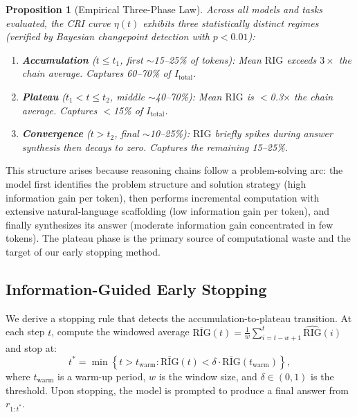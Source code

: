 \documentclass{article}
\newtheorem{proposition}[theorem]{Proposition}
\newcommand{\RIG}{\mathrm{RIG}}
\newcommand{\Itotal}{I_{\mathrm{total}}}
\begin{document}
\begin{proposition}[Empirical Three-Phase Law]
\label{prop:phases}
Across all models and tasks evaluated, the CRI curve $\eta(t)$ exhibits three statistically distinct regimes (verified by Bayesian changepoint detection with $p < 0.01$):
\begin{enumerate}[leftmargin=*,itemsep=1pt]
    \item \textbf{Accumulation} ($t \leq t_1$, first $\sim$15--25\% of tokens): Mean $\RIG$ exceeds $3\times$ the chain average. Captures 60--70\% of $\Itotal$.
    \item \textbf{Plateau} ($t_1 < t \leq t_2$, middle $\sim$40--70\%): Mean $\RIG$ is $<$0.3$\times$ the chain average. Captures $<$15\% of $\Itotal$.
    \item \textbf{Convergence} ($t > t_2$, final $\sim$10--25\%): $\RIG$ briefly spikes during answer synthesis then decays to zero. Captures the remaining 15--25\%.
\end{enumerate}
\end{proposition}

This structure arises because reasoning chains follow a problem-solving arc: the model first identifies the problem structure and solution strategy (high information gain per token), then performs incremental computation with extensive natural-language scaffolding (low information gain per token), and finally synthesizes its answer (moderate information gain concentrated in few tokens). The plateau phase is the primary source of computational waste and the target of our early stopping method.

\subsection{Information-Guided Early Stopping}
\label{sec:stopping}

We derive a stopping rule that detects the accumulation-to-plateau transition. At each step $t$, compute the windowed average $\overline{\RIG}(t) = \frac{1}{w} \sum_{i=t-w+1}^{t} \widehat{\RIG}(i)$ and stop at:
\begin{equation}
    t^* = \min\left\{ t > t_{\mathrm{warm}} : \overline{\RIG}(t) < \delta \cdot \overline{\RIG}(t_{\mathrm{warm}}) \right\},
    \label{eq:stopping}
\end{equation}
where $t_{\mathrm{warm}}$ is a warm-up period, $w$ is the window size, and $\delta \in (0,1)$ is the threshold. Upon stopping, the model is prompted to produce a final answer from $r_{1:t^*}$.
\end{document}
